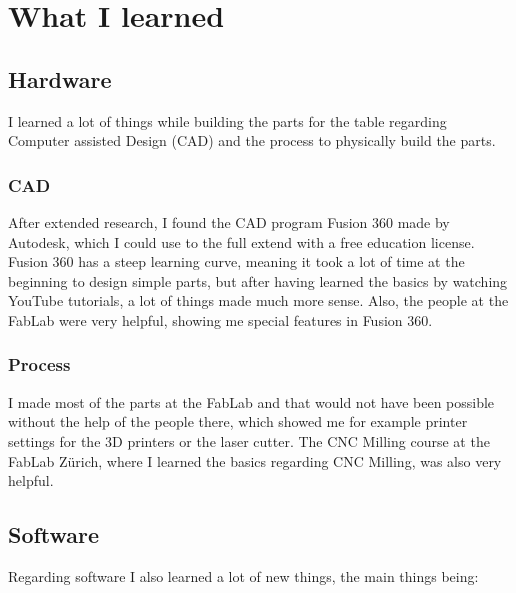\section{What I learned}\label{sec:learned}

\subsection{Hardware}\label{subsec:hardware}
I learned a lot of things while building the parts for the table regarding Computer assisted Design (CAD) and the process to physically build the parts.

\subsubsection{CAD}
After extended research, I found the CAD program Fusion 360\autocite{fusion360} made by Autodesk, which I could use to the full extend with a free education license\autocite{autodesk-education}.
Fusion 360 has a steep learning curve, meaning it took a lot of time at the beginning to design simple parts, but after having learned the basics by watching YouTube\autocite{youtube,fusion360-tutorial} tutorials, a lot of things made much more sense.
Also, the people at the FabLab\autocite{fablab} were very helpful, showing me special features in Fusion 360\autocite{fusion360}.

\subsubsection{Process}
I made most of the parts at the FabLab and that would not have been possible without the help of the people there, which showed me for example printer settings for the 3D printers or the laser cutter.
The CNC Milling course at the FabLab Zürich, where I learned the basics regarding CNC Milling, was also very helpful.

\subsection{Software}\label{subsec:software}
Regarding software I also learned a lot of new things, the main things being:

